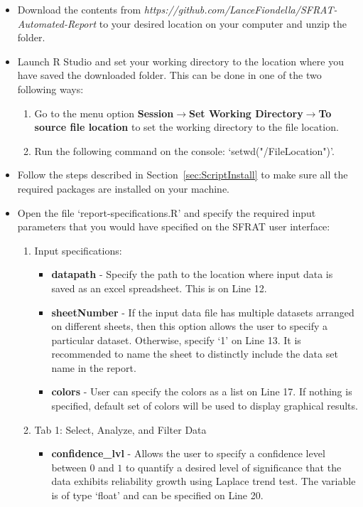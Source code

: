 \documentclass[conference]{IEEEtran}
\begin{document}
\begin{itemize}
  \item {Download the contents from \textit{https://github.com/LanceFiondella/SFRAT-Automated-Report} to your desired location on your computer and unzip the folder.}
  \item {Launch R Studio and set your working directory to the location where you have saved the downloaded folder. This can be done in one of the two following ways:
  \begin{enumerate}
    \item {Go to the menu option \textbf{Session}$\to$\textbf{Set Working Directory}$\to$\textbf{To source file location} to set the working directory to the file location.}
    \item {Run the following command on the console: `setwd("/FileLocation")'.}
  \end{enumerate}
  }
  \item {Follow the steps described in Section~\ref{sec:ScriptInstall} to make sure all the required packages are installed on your machine.}
  \item {Open the file `report-specifications.R’ and specify the required input parameters that you would have specified on the SFRAT user interface:
  \begin{enumerate}
    \item {Input specifications:
    \begin{itemize}
      \item {\textbf{datapath} - Specify the path to the location where input data is saved as an excel spreadsheet. This is on Line 12.}
      \item {\textbf{sheetNumber} - If the input data file has multiple datasets arranged on different sheets, then this option allows the user to specify a particular dataset. Otherwise, specify `1' on Line 13. It is recommended to name the sheet to distinctly include the data set name in the report.}
      \item {\textbf{colors} - User can specify the colors as a list on Line 17. If nothing is specified, default set of colors will be used to display graphical results.}
    \end{itemize}
  }
    \item {Tab 1: Select, Analyze, and Filter Data
    \begin{itemize}
    \item{\textbf{confidence\_lvl} - Allows the user to specify a confidence level between $0$ and $1$ to quantify  a desired level of significance that the data exhibits reliability growth using Laplace trend test. The variable is of type `float' and can be specified on Line 20.}

\end{itemize}}
\end{enumerate}}
\end{itemize}
\end{document}
